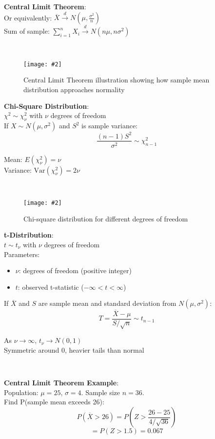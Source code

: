\documentclass{article}
\def\imagewidth{0.9}
\newenvironment{cheatformula}[1][Title]{
    \begin{minipage}{\linewidth}
    \textbf{#1}:\\
}{
    \end{minipage}\\[2ex]
}
\newcommand{\cheatimage}[4][\imagewidth]{
    \begin{figure}[H]
        \centering
        \texttt{[image: \#2]}
        \caption{#3}
        \label{#4}
    \end{figure}
}
\begin{document}
\begin{multicols*}{2}
\begin{cheatformula}[Central Limit Theorem]
    Or equivalently: $\overline{X} \xrightarrow{d} N\left(\mu, \frac{\sigma^2}{n}\right)$\\
    
    Sum of sample: $\sum_{i=1}^n X_i \xrightarrow{d} N(n\mu, n\sigma^2)$
\end{cheatformula}

\cheatimage[1.0]{central_limit_theorem.png}{Central Limit Theorem illustration showing how sample mean distribution approaches normality}{fig:clt-illustration}

\begin{cheatformula}[Chi-Square Distribution]
    $\chi^2 \sim \chi^2_\nu$ with $\nu$ degrees of freedom\\
    
    If $X \sim N(\mu, \sigma^2)$ and $S^2$ is sample variance:
    $$\frac{(n-1)S^2}{\sigma^2} \sim \chi^2_{n-1}$$
    
    Mean: $E(\chi^2_\nu) = \nu$\\
    Variance: $\text{Var}(\chi^2_\nu) = 2\nu$
\end{cheatformula}

\cheatimage[1.0]{chi_square_distribution.png}{Chi-square distribution for different degrees of freedom}{fig:chisquare-dist}

\begin{cheatformula}[t-Distribution]
    $t \sim t_\nu$ with $\nu$ degrees of freedom\\
    Parameters:
    \begin{itemize}
        \item $\nu$: degrees of freedom (positive integer)
        \item $t$: observed t-statistic ($-\infty < t < \infty$)
    \end{itemize}
    
    If $\overline{X}$ and $S$ are sample mean and standard deviation from $N(\mu, \sigma^2)$:
    $$T = \frac{\overline{X} - \mu}{S/\sqrt{n}} \sim t_{n-1}$$
    
    As $\nu \to \infty$, $t_\nu \to N(0,1)$\\
    Symmetric around 0, heavier tails than normal
\end{cheatformula}

\begin{cheatformula}[Central Limit Theorem Example]
    Population: $\mu = 25$, $\sigma = 4$. Sample size $n = 36$.\\
    Find P(sample mean exceeds 26):
    $$P(\overline{X} > 26) = P\left(Z > \frac{26-25}{4/\sqrt{36}}\right)$$
    $$= P(Z > 1.5) = 0.067$$
\end{cheatformula}


\end{multicols*}
\end{document}
